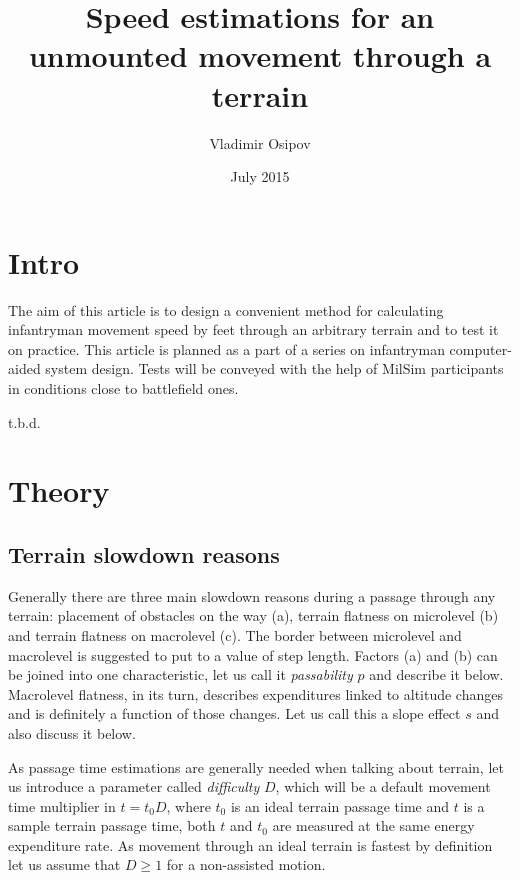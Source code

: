 \documentclass[12pt]{article}
\begin{document}
\title{Speed estimations for an unmounted movement through a terrain}
\author{Vladimir Osipov}
\date{July 2015}
\maketitle

\section{Intro}

The aim of this article is to design a convenient method for calculating infantryman movement speed by feet through an arbitrary terrain and to test it on practice. This article is planned as a part of a series on infantryman computer-aided system design. Tests will be conveyed with the help of MilSim participants in conditions close to battlefield ones.

t.b.d.

\newpage

\section{Theory}

\subsection{Terrain slowdown reasons}

Generally there are three main slowdown reasons during a passage through any terrain: placement of obstacles on the way (a), terrain flatness on microlevel (b) and terrain flatness on macrolevel (c). The border between microlevel and macrolevel is suggested to put to a value of step length. Factors (a) and (b) can be joined into one characteristic, let us call it \textit{passability} $p$ and describe it below. Macrolevel flatness, in its turn, describes expenditures linked to altitude changes and is definitely a function of those changes. Let us call this a slope effect $s$ and also discuss it below.

As passage time estimations are generally needed when talking about terrain, let us introduce a parameter called \textit{difficulty} $D$, which will be a default movement time multiplier in $t=t_{0}D$, where $t_{0}$ is an ideal terrain passage time and $t$ is a sample terrain passage time, both $t$ and $t_{0}$ are measured at the same energy expenditure rate. As movement through an ideal terrain is fastest by definition let us assume that $D\geq1$ for a non-assisted motion.
\end{document}
